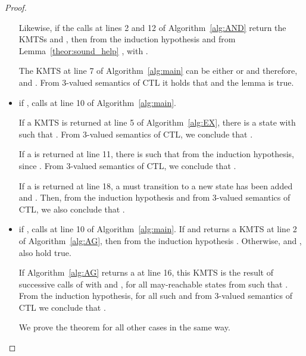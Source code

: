 \begin{proof}
\begin{itemize}
Likewise, if the calls at lines 2 and 12 of Algorithm~\ref{alg:AND} 
return the KMTSs  and , then from the induction hypothesis 
 and from Lemma~\ref{theor:sound_help} 
,  
with .

The KMTS  at line 7 of Algorithm~\ref{alg:main} 
can be either  or  and 
therefore,  and  
.  From 3-valued semantics 
of CTL it holds that  
and the lemma is true. 

\item if ,  calls 
 at line 10 of 
Algorithm~\ref{alg:main}.  

If a KMTS  is returned at line 5 of Algorithm~\ref{alg:EX}, 
there is a state  with  
such that .  
From 3-valued semantics of CTL, we conclude that 
.

If a  is returned at line 11, there is 
 such that 
 from the induction hypothesis, 
since .  
From 3-valued semantics of CTL, we conclude that 
.   

If a  is returned at line 18, a must transition 
 to a new state has been added and .  
Then, from the induction hypothesis 
 and from 3-valued semantics of CTL, we also conclude that 
. 



























\item if ,  
calls  at line 10 of 
Algorithm~\ref{alg:main}.  If  and 
 returns a KMTS 
 at line 2 of Algorithm~\ref{alg:AG}, then from the induction 
hypothesis .  Otherwise, 
 and , 
 also hold true.    

If Algorithm~\ref{alg:AG} returns a  at line 16, 
this KMTS is the result of successive calls of  with  and , for
all may-reachable states  from  
such that .     
From the induction hypothesis,  
for all such  and from 3-valued semantics of CTL we conclude that 
.   
  
We prove the theorem for all other cases in the same way.  



























\end{itemize} 
\end{proof}
